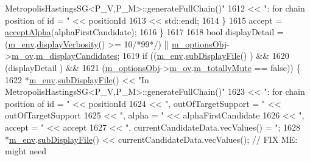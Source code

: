 \begin{DoxyCode}
{       MetropolisHastingsSG<P\_V,P\_M>::generateFullChain()"}
1612                                 << \textcolor{stringliteral}{": for chain position of id = "} << positionId
1613                                 << std::endl;
1614       \}
1615       accept = \hyperlink{class_q_u_e_s_o_1_1_metropolis_hastings_s_g_abef3a3b60bc10db208864f6db09eeea8}{acceptAlpha}(alphaFirstCandidate);
1616     \}
1617 
1618     \textcolor{keywordtype}{bool} displayDetail = (\hyperlink{class_q_u_e_s_o_1_1_metropolis_hastings_s_g_ac8ea061e55b920e0c8f9bce5c3f20e52}{m\_env}.\hyperlink{class_q_u_e_s_o_1_1_base_environment_a1fe5f244fc0316a0ab3e37463f108b96}{displayVerbosity}() >= 10\textcolor{comment}{/*99*/}) || 
      \hyperlink{class_q_u_e_s_o_1_1_metropolis_hastings_s_g_a5d0bc9f73d50d272aa6bfb5ef5939ef3}{m\_optionsObj}->\hyperlink{class_q_u_e_s_o_1_1_metropolis_hastings_s_g_options_a9d4792d9fc2dc5439b8ab489b0c236eb}{m\_ov}.\hyperlink{class_q_u_e_s_o_1_1_mh_options_values_a1df386cecfd87745e4d8adfb472d3443}{m\_displayCandidates};
1619     if ((\hyperlink{class_q_u_e_s_o_1_1_metropolis_hastings_s_g_ac8ea061e55b920e0c8f9bce5c3f20e52}{m\_env}.\hyperlink{class_q_u_e_s_o_1_1_base_environment_a8a0064746ae8dddfece4229b9ad374d6}{subDisplayFile}()                   ) &&
1620         (displayDetail                            ) &&
1621         (\hyperlink{class_q_u_e_s_o_1_1_metropolis_hastings_s_g_a5d0bc9f73d50d272aa6bfb5ef5939ef3}{m\_optionsObj}->\hyperlink{class_q_u_e_s_o_1_1_metropolis_hastings_s_g_options_a9d4792d9fc2dc5439b8ab489b0c236eb}{m\_ov}.\hyperlink{class_q_u_e_s_o_1_1_mh_options_values_af812309e81191e88dfdc87c5815141a3}{m\_totallyMute} == \textcolor{keyword}{false})) \{
1622       *\hyperlink{class_q_u_e_s_o_1_1_metropolis_hastings_s_g_ac8ea061e55b920e0c8f9bce5c3f20e52}{m\_env}.\hyperlink{class_q_u_e_s_o_1_1_base_environment_a8a0064746ae8dddfece4229b9ad374d6}{subDisplayFile}() << \textcolor{stringliteral}{"In MetropolisHastingsSG<P\_V,P\_M>::generateFullChain()"}
1623                               << \textcolor{stringliteral}{": for chain position of id = "} << positionId
1624                               << \textcolor{stringliteral}{", outOfTargetSupport = "}       << outOfTargetSupport
1625                               << \textcolor{stringliteral}{", alpha = "}                    << alphaFirstCandidate
1626                               << \textcolor{stringliteral}{", accept = "}                   << accept
1627                               << \textcolor{stringliteral}{", currentCandidateData.vecValues() = "};
1628       *\hyperlink{class_q_u_e_s_o_1_1_metropolis_hastings_s_g_ac8ea061e55b920e0c8f9bce5c3f20e52}{m\_env}.\hyperlink{class_q_u_e_s_o_1_1_base_environment_a8a0064746ae8dddfece4229b9ad374d6}{subDisplayFile}() << currentCandidateData.vecValues(); \textcolor{comment}{// FIX ME: might need
}
\end{DoxyCode}
